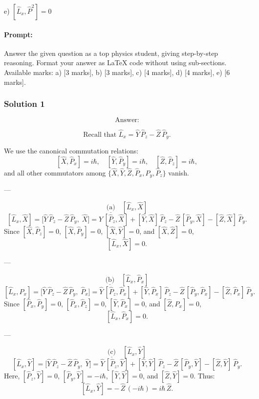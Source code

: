 \documentclass{article}
\begin{document}
e) $\left[\hat{L}_x, \hat{P}^2\right] = 0$

\paragraph{Prompt: \\} 
Answer the given question as a top physics student, giving step-by-step reasoning. Format your answer as LaTeX code without using sub-sections. Available marks: a) [3 marks], b) [3 marks], c) [4 marks], d) [4 marks], e) [6 marks].

\subsubsection{Solution 1}
\[
\text{Answer:}
\]

\[
\text{Recall that } \hat{L}_x = \hat{Y}\,\hat{P}_z - \hat{Z}\,\hat{P}_y.
\]

We use the canonical commutation relations:
\[
[\hat{X}, \hat{P}_x] = i\hbar, \quad [\hat{Y}, \hat{P}_y] = i\hbar, \quad [\hat{Z}, \hat{P}_z] = i\hbar,
\]
and all other commutators among \(\{\hat{X},\hat{Y},\hat{Z},\hat{P}_x,\hat{P}_y,\hat{P}_z\}\) vanish.

---

\[
\underline{\text{(a)}} \quad [\hat{L}_x, \hat{X}]
\]
\[
[\hat{L}_x, \hat{X}] = \Big[\hat{Y}\,\hat{P}_z - \hat{Z}\,\hat{P}_y,\;\hat{X}\Big] 
= \hat{Y}\,[\hat{P}_z,\hat{X}] + [\hat{Y},\hat{X}]\,\hat{P}_z - \hat{Z}\,[\hat{P}_y,\hat{X}] - [\hat{Z},\hat{X}]\,\hat{P}_y.
\]
Since \( [\hat{X}, \hat{P}_z]=0 \), \( [\hat{X}, \hat{P}_y]=0 \), \( [\hat{X}, \hat{Y}]=0 \), and \( [\hat{X}, \hat{Z}]=0 \),
\[
[\hat{L}_x, \hat{X}] = 0.
\]

---

\[
\underline{\text{(b)}} \quad [\hat{L}_x, \hat{P}_x]
\]
\[
[\hat{L}_x, \hat{P}_x] = \Big[\hat{Y}\,\hat{P}_z - \hat{Z}\,\hat{P}_y,\;\hat{P}_x\Big] 
= \hat{Y}\,[\hat{P}_z,\hat{P}_x] + [\hat{Y},\hat{P}_x]\,\hat{P}_z - \hat{Z}\,[\hat{P}_y,\hat{P}_x] - [\hat{Z},\hat{P}_x]\,\hat{P}_y.
\]
Since \( [\hat{P}_x,\hat{P}_y]=0 \), \( [\hat{P}_x,\hat{P}_z]=0 \), \( [\hat{Y},\hat{P}_x]=0 \), and \( [\hat{Z},\hat{P}_x]=0 \),
\[
[\hat{L}_x, \hat{P}_x] = 0.
\]

---

\[
\underline{\text{(c)}} \quad [\hat{L}_x, \hat{Y}]
\]
\[
[\hat{L}_x, \hat{Y}] = \Big[\hat{Y}\,\hat{P}_z - \hat{Z}\,\hat{P}_y,\;\hat{Y}\Big]
= \hat{Y}\,[\hat{P}_z,\hat{Y}] + [\hat{Y},\hat{Y}]\,\hat{P}_z - \hat{Z}\,[\hat{P}_y,\hat{Y}] - [\hat{Z},\hat{Y}]\,\hat{P}_y.
\]
Here, \( [\hat{P}_z,\hat{Y}] = 0 \), \( [\hat{P}_y,\hat{Y}] = -i\hbar \), \( [\hat{Y},\hat{Y}] = 0 \), and \( [\hat{Z},\hat{Y}] = 0 \). Thus:
\[
[\hat{L}_x, \hat{Y}] = -\,\hat{Z}\,(-i\hbar) = i\hbar\,\hat{Z}.
\]
\end{document}
